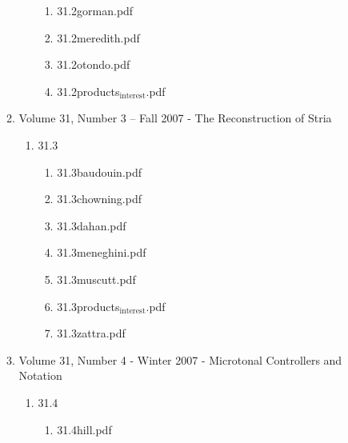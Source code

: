 \documentclass[11pt]{article}
\begin{document}
\begin{enumerate}
\begin{enumerate}
\begin{enumerate}
\begin{enumerate}
\item 31.2gorman.pdf
\label{sec-1-1-1-1-11-19-19-7-1-2}

\item 31.2meredith.pdf
\label{sec-1-1-1-1-11-19-19-7-1-3}

\item 31.2otondo.pdf
\label{sec-1-1-1-1-11-19-19-7-1-4}

\item 31.2products$_{\text{interest}}$.pdf
\label{sec-1-1-1-1-11-19-19-7-1-5}
\end{enumerate}
\end{enumerate}

\item Volume 31, Number 3 – Fall 2007 - The Reconstruction of Stria
\label{sec-1-1-1-1-11-19-19-8}
\begin{enumerate}
\item 31.3
\label{sec-1-1-1-1-11-19-19-8-1}
\begin{enumerate}
\item 31.3baudouin.pdf
\label{sec-1-1-1-1-11-19-19-8-1-1}

\item 31.3chowning.pdf
\label{sec-1-1-1-1-11-19-19-8-1-2}

\item 31.3dahan.pdf
\label{sec-1-1-1-1-11-19-19-8-1-3}

\item 31.3meneghini.pdf
\label{sec-1-1-1-1-11-19-19-8-1-4}

\item 31.3muscutt.pdf
\label{sec-1-1-1-1-11-19-19-8-1-5}

\item 31.3products$_{\text{interest}}$.pdf
\label{sec-1-1-1-1-11-19-19-8-1-6}

\item 31.3zattra.pdf
\label{sec-1-1-1-1-11-19-19-8-1-7}
\end{enumerate}
\end{enumerate}

\item Volume 31, Number 4 - Winter 2007 - Microtonal Controllers and Notation
\label{sec-1-1-1-1-11-19-19-9}
\begin{enumerate}
\item 31.4
\label{sec-1-1-1-1-11-19-19-9-1}
\begin{enumerate}
\item 31.4hill.pdf
\label{sec-1-1-1-1-11-19-19-9-1-1}


\end{enumerate}
\end{enumerate}
\end{enumerate}
\end{enumerate}
\end{document}
